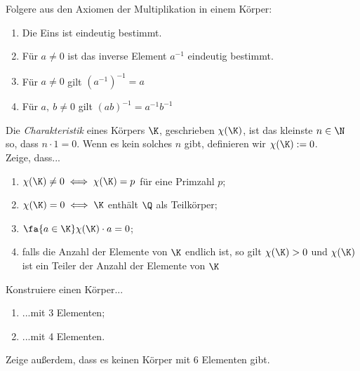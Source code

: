 \begin{prob}
  Folgere aus den Axiomen der Multiplikation in einem Körper:
  \begin{enumerate}[label=(\alph*)]
  \item Die Eins ist eindeutig bestimmt.
  \item Für $a \neq 0$ ist das inverse Element $a^{-1}$ eindeutig bestimmt.
  \item Für $a \neq 0$ gilt $(a^{-1})^{-1} = a$
  \item Für $a,\ b\neq 0$ gilt $(ab)^{-1} = a^{-1}b^{-1}$
  \end{enumerate}
\end{prob}

\begin{prob}
  Die \textit{Charakteristik} eines Körpers $\K$, geschrieben $\chi(\K)$, ist
  das kleinste $n \in \N$ so, dass $n \cdot 1 = 0$. Wenn es kein solches $n$
  gibt, definieren wir $\chi(\K) := 0$. \\
  Zeige, dass...
  \begin{enumerate}[label=(\alph*)]
  \item $\chi(\K) \neq 0 \iff \chi(\K)=p$ für eine Primzahl $p$;
  \item $\chi(\K)= 0 \iff \K$ enthält $\Q$ als Teilkörper;
  \item $\fa{a \in \K} \chi(\K) \cdot a = 0$;
  \item falls die Anzahl der Elemente von $\K$ endlich ist, so gilt
    $\chi(\K) > 0$ und $\chi(\K)$ ist ein Teiler der Anzahl der Elemente von $\K$
  \end{enumerate}
\end{prob}

\begin{prob}Konstruiere einen Körper...
  \begin{enumerate}[label=(\alph*)]
  \item ...mit 3 Elementen;
  \item ...mit 4 Elementen.
  \end{enumerate}
  Zeige außerdem, dass es keinen Körper mit 6 Elementen gibt.
\end{prob}

